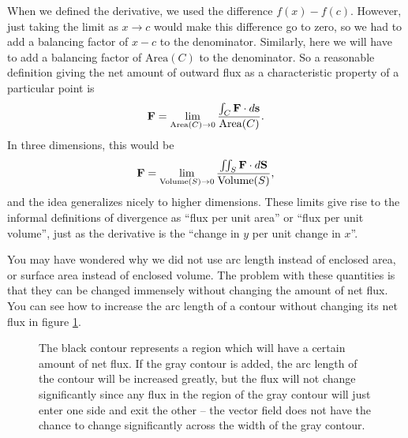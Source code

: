 \documentclass{myarticle}
\let\div\relax %
\DeclareMathOperator{\div}{div}
\renewcommand{\vec}[1]{\mathbf{#1}}
\theoremstyle{nospace}
\newtheorem{old series theorem}{Theorem}
\newenvironment{series theorem}
{\begin{mdframed}\begin{old series theorem}}
    {\end{old series theorem}\end{mdframed}}
\begin{document}
When we defined the derivative, we used the difference $f(x) - f(c)$.
However, just taking the limit as $x \to c$ would make this difference
go to zero, so we had to add a balancing factor of $x - c$ to the
denominator. Similarly, here we will have to add a balancing factor of
$\text{Area}(C)$ to the denominator. So a reasonable definition giving
the net amount of outward flux as a characteristic property of a
particular point is
\[
  \div \vec{F} = \lim_{\text{Area}(C) \to 0}
  \frac{\int_C \vec{F} \cdot d\vec{s}}{\text{Area}(C)}.
\]
In three dimensions, this would be
\[
  \div \vec{F} = \lim_{\text{Volume}(S) \to 0}
  \frac{\iint_S \vec{F} \cdot d\vec{S}}{\text{Volume}(S)},
\]
and the idea generalizes nicely to higher dimensions. These limits
give rise to the informal definitions of divergence as ``flux per unit
area'' or ``flux per unit volume'', just as the derivative is the
``change in $y$ per unit change in $x$''.

You may have wondered why we did not use arc length instead of
enclosed area, or surface area instead of enclosed volume. The problem
with these quantities is that they can be changed immensely without
changing the amount of net flux. You can see how to increase the arc
length of a contour without changing its net flux in figure
\ref{fig:ripple flux}.

\begin{figure}[htb!] \centering
  \caption{The black contour represents a region which will have a
    certain amount of net flux. If the gray contour is added, the arc
    length of the contour will be increased greatly, but the flux will
    not change significantly since any flux in the region of the gray
    contour will just enter one side and exit the other -- the vector
    field does not have the chance to change significantly across the
    width of the gray contour.}
  \label{fig:ripple flux}
\end{figure}
\end{document}

